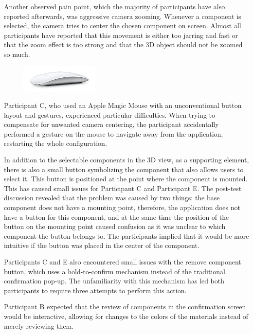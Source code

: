 Another observed pain point, which the majority of participants have also reported afterwards, was aggressive camera zooming. Whenever a component is selected, the camera tries to center the chosen component on screen. Almost all participants have reported that this movement is either too jarring and fast or that the zoom effect is too strong and that the 3D object should not be zoomed so much. 

\begin{figure}   
    \centering
    \includegraphics[width=0.35\textwidth]{images/image_magicmouse.jpg}
\end{figure}

Participant C, who used an Apple Magic Mouse with an unconventional button layout and gestures, experienced particular difficulties. When trying to compensate for unwanted camera centering, the participant accidentally performed a gesture on the mouse to navigate away from the application, restarting the whole configuration.

In addition to the selectable components in the 3D view, as a supporting element, there is also a small button symbolizing the component that also allows users to select it. This button is positioned at the point where the component is mounted. This has caused small issues for Participant C and Participant E. The post-test discussion revealed that the problem was caused by two things: the base component does not have a mounting point, therefore, the application does not have a button for this component, and at the same time the position of the button on the mounting point caused confusion as it was unclear to which component the button belongs to. The participants implied that it would be more intuitive if the button was placed in the center of the component.

Participants C and E also encountered small issues with the remove component button, which uses a hold-to-confirm mechanism instead of the traditional confirmation pop-up. The unfamiliarity with this mechanism has led both participants to require three attempts to perform this action. 

Participant B expected that the review of components in the confirmation screen would be interactive, allowing for changes to the colors of the materials instead of merely reviewing them.

